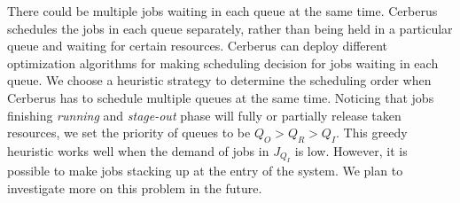 There could be multiple jobs waiting in each queue at the same time. 
Cerberus schedules the jobs in each queue separately, 
rather than being held in a particular queue and waiting for certain resources.
Cerberus can deploy different optimization algorithms for making scheduling decision
for jobs waiting in each queue.
We choose a heuristic strategy to determine the scheduling order when
Cerberus has to schedule multiple queues at the same time.
Noticing that jobs finishing \textit{running} and \textit{stage-out} phase
will fully or partially release taken resources,
we set the priority of queues to be $Q_O > Q_R > Q_I$.
This greedy heuristic works well when the demand of jobs in $J_{Q_I}$ is low.
However, it is possible to make jobs stacking up at the entry of the system.
We plan to investigate more on this problem in the future.


% 


